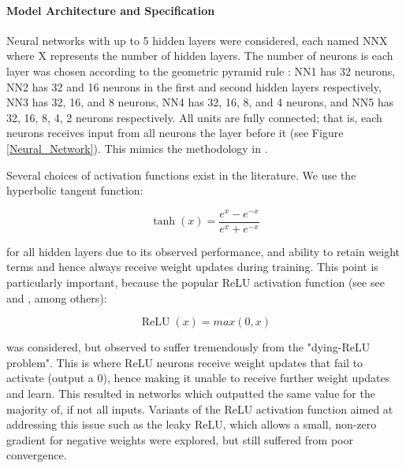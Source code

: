 \documentclass[11pt, a4paper, table]{article}
\begin{document}
\paragraph{Model Architecture and Specification}

Neural networks with up to 5 hidden layers were considered, each named NNX where X represents the number of hidden layers. The number of neurons is each layer was chosen according to the geometric pyramid rule \citep{masters_practical_1993}: NN1 has 32 neurons, NN2 has 32 and 16 neurons in the first and second hidden layers respectively, NN3 has 32, 16, and 8 neurons, NN4 has 32, 16, 8, and 4 neurons, and NN5 has 32, 16, 8, 4, 2 neurons respectively. All units are fully connected; that is, each neurons receives input from all neurons the layer before it (see Figure \ref{Neural_Network}). This mimics the methodology in \cite{gu_empirical_2018}.

Several choices of activation functions exist in the literature. We use the hyperbolic tangent function:

\begin{equation}
\operatorname{tanh}(x) = \frac{e^x - e^{-x}}{e^x + e^{-x}}
\end{equation}

for all hidden layers due to its observed performance, and ability to retain weight terms and hence always receive weight updates during training. This point is particularly important, because the popular ReLU activation function (see see \cite{lecun_deep_2015} and \cite{ramachandran_searching_2017}, among others):

\begin{equation}
\operatorname{ReLU}(x) = max(0, x)
\end{equation}

was considered, but observed to suffer tremendously from the "dying-ReLU problem". This is where ReLU neurons receive weight updates that fail to activate (output a 0), hence making it unable to receive further weight updates and learn. This resulted in networks which outputted the same value for the majority of, if not all inputs. Variants of the ReLU activation function aimed at addressing this issue such as the leaky ReLU, which allows a small, non-zero gradient for negative weights were explored, but still suffered from poor convergence.
\end{document}
